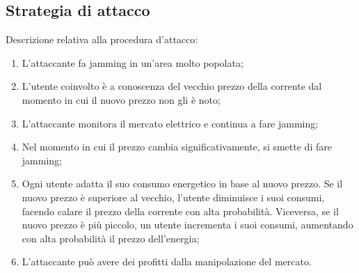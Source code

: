 \subsection{Strategia di attacco}
Descrizione relativa alla procedura d'attacco:
\begin{enumerate}
	\item L'attaccante fa jamming in un'area molto popolata;
	\item L'utente coinvolto è a conoscenza del vecchio prezzo della corrente dal momento in cui il nuovo prezzo non gli è noto;
	\item L'attaccante monitora il mercato elettrico e continua a fare jamming;
	\item Nel momento in cui il prezzo cambia significativamente, si smette di fare jamming;
	\item Ogni utente adatta il suo consumo energetico in base al nuovo prezzo. Se il nuovo prezzo è superiore al vecchio, l'utente diminuisce i suoi consumi, facendo calare il prezzo della corrente con alta probabilità. Viceversa, se il nuovo prezzo è più piccolo, un utente incrementa i suoi consumi, aumentando con alta probabilità il prezzo dell'energia;
	\item L'attaccante può avere dei profitti dalla manipolazione del mercato.
\end{enumerate}
